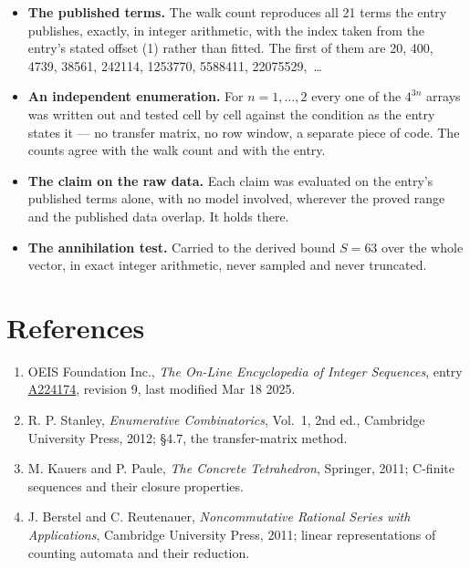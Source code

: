\documentclass[11pt]{article}
\theoremstyle{definition}
\begin{document}
\begin{itemize}

\item {\bfseries The published terms.} The walk count reproduces all 21 terms the entry publishes, exactly, in integer arithmetic, with the index taken from the entry's stated offset (1) rather than fitted. The first of them are 20, 400, 4739, 38561, 242114, 1253770, 5588411, 22075529,~\dots

\item {\bfseries An independent enumeration.} For $n = 1,\dots,2$ every one of the $4^{3n}$ arrays was written out and tested cell by cell against the condition as the entry states it --- no transfer matrix, no row window, a separate piece of code. The counts agree with the walk count and with the entry.

\item {\bfseries The claim on the raw data.} Each claim was evaluated on the entry's published terms alone, with no model involved, wherever the proved range and the published data overlap. It holds there.

\item {\bfseries The annihilation test.} Carried to the derived bound $S = 63$ over the whole vector, in exact integer arithmetic, never sampled and never truncated.

\end{itemize}

\section{References}

\begin{enumerate}

\item OEIS Foundation Inc., \emph{The On-Line Encyclopedia of Integer Sequences}, entry \href{https://oeis.org/A224174}{A224174}, revision 9, last modified Mar 18 2025.

\item R. P. Stanley, \emph{Enumerative Combinatorics}, Vol.~1, 2nd ed., Cambridge University Press, 2012; \S4.7, the transfer-matrix method.

\item M. Kauers and P. Paule, \emph{The Concrete Tetrahedron}, Springer, 2011; C-finite sequences and their closure properties.

\item J. Berstel and C. Reutenauer, \emph{Noncommutative Rational Series with Applications}, Cambridge University Press, 2011; linear representations of counting automata and their reduction.

\end{enumerate}
\end{document}
